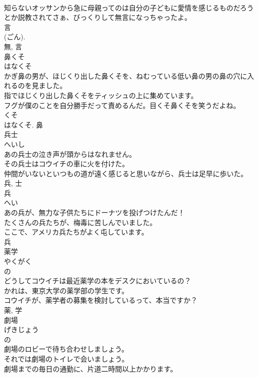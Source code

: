 \documentclass[8pt]{extreport}
\begin{document}
\begin{CJK}{UTF8}{min}
\\	知らないオッサンから急に母親ってのは自分の子どもに愛情を感じるものだろうとか説教されてさぁ、びっくりして無言になっちゃったよ。	
\\	言 
\\	(ごん). 
\\	無, 言	
\\	鼻くそ	
\\	はなくそ	
\\	かぎ鼻の男が、ほじくり出した鼻くそを、ねむっている低い鼻の男の鼻の穴に入れるのを見ました。	
\\	指でほじくり出した鼻くそをティッシュの上に集めています。	
\\	フグが僕のことを自分勝手だって責めるんだ。目くそ鼻くそを笑うだよね。	
\\	くそ 
\\	はなくそ.	鼻	
\\	兵士	
\\	へいし	
\\	あの兵士の泣き声が頭からはなれません。	
\\	その兵士はコウイチの車に火を付けた。	
\\	仲間がいないといつもの道が遠く感じると思いながら、兵士は足早に歩いた。	
\\	兵, 士	
\\	兵	
\\	へい	
\\	あの兵が、無力な子供たちにドーナツを投げつけたんだ！	
\\	たくさんの兵たちが、梅毒に苦しんでいました。	
\\	ここで、アメリカ兵たちがよく屯しています。	
\\	兵	
\\	薬学	
\\	やくがく	
\\	の 
\\	どうしてコウイチは最近薬学の本をデスクにおいているの？	
\\	かれは、東京大学の薬学部の学生です。	
\\	コウイチが、薬学者の募集を検討しているって、本当ですか？	
\\	薬, 学	
\\	劇場	
\\	げきじょう	
\\	の 
\\	劇場のロビーで待ち合わせしましょう。	
\\	それでは劇場のトイレで会いましょう。	
\\	劇場までの毎日の通勤に、片道二時間以上かかります。	

\end{CJK}
\end{document}
